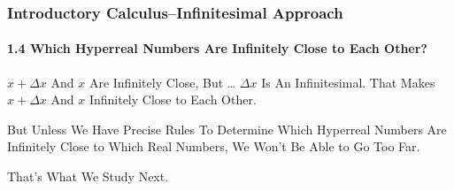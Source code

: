 \begin{frame}
\frametitle{Introductory Calculus--Infinitesimal Approach}
\framesubtitle{1.4 Which Hyperreal Numbers Are Infinitely Close to Each Other?}
\label{slide:1.4-12}
\begin{block}{$x+\Delta x$ And $x$ Are Infinitely Close, But \dots}
$\Delta x$ Is An Infinitesimal. That Makes $x+\Delta x$ And $x$ Infinitely Close to Each Other.

But Unless We Have Precise Rules To Determine Which Hyperreal Numbers Are \alert{Infinitely Close} to Which Real Numbers, We Won't Be Able to Go Too Far.
\end{block}
\pause
\alert{That's What We Study Next}.
\end{frame}
